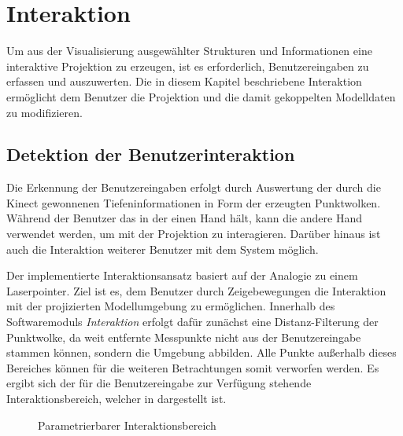 \chapter{Interaktion}
\label{chap.interaction}
Um aus der Visualisierung ausgewählter Strukturen und Informationen eine interaktive Projektion zu erzeugen, ist es erforderlich, Benutzereingaben zu erfassen und auszuwerten. Die in diesem Kapitel beschriebene Interaktion ermöglicht dem Benutzer die Projektion und die damit gekoppelten Modelldaten zu modifizieren.

\section{Detektion der Benutzerinteraktion}
Die Erkennung der Benutzereingaben erfolgt durch Auswertung der durch die Kinect gewonnenen Tiefeninformationen in Form der erzeugten Punktwolken. Während der Benutzer das \kps{} in der einen Hand hält, kann die andere Hand verwendet werden, um mit der Projektion zu interagieren. Darüber hinaus ist auch die Interaktion weiterer Benutzer mit dem System möglich.\\
\prever{
}

Der implementierte Interaktionsansatz basiert auf der Analogie zu einem Laserpointer. Ziel ist es, dem Benutzer durch Zeigebewegungen die Interaktion mit der projizierten Modellumgebung zu ermöglichen. Innerhalb des Softwaremoduls \textit{Interaktion} erfolgt dafür zunächst eine Distanz-Filterung der Punktwolke, da weit entfernte Messpunkte nicht aus der Benutzereingabe stammen können, sondern die Umgebung abbilden. Alle Punkte außerhalb dieses Bereiches können für die weiteren Betrachtungen somit verworfen werden. Es ergibt sich der für die Benutzereingabe zur Verfügung stehende Interaktionsbereich, welcher in  dargestellt ist.\\

\begin{figure}[!ht]
	\begin{center}
		\caption{Parametrierbarer Interaktionsbereich}
		\label{fig.intfov}
	\end{center}
\end{figure}

